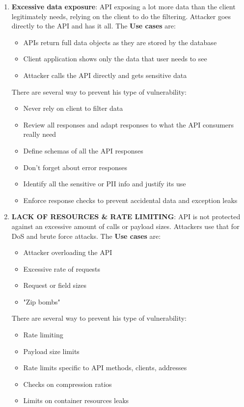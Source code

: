 \documentclass[10pt,a4paper]{report}
\begin{document}
\begin{enumerate}
	\item \textbf{Excessive data exposure}: API exposing a lot more data than the client legitimately needs, relying on the client to do the filtering. Attacker goes directly to the API and has it all. The \textbf{Use cases} are:
	\begin{itemize}
		\item APIs return full data objects as they are stored by the database
		\item Client application shows only the data that user needs to see
		\item Attacker calls the API directly and gets sensitive data
	\end{itemize}
	There are several way to prevent his type of vulnerability:
	\begin{itemize}
		\item Never rely on client to filter data
		\item Review all responses and adapt responses to what the API
		consumers really need
		\item Define schemas of all the API responses
		\item Don’t forget about error responses
		\item Identify all the sensitive or PII info and justify its use
		\item Enforce response checks to prevent accidental data and exception
		leaks
	\end{itemize}


		\item \textbf{LACK OF RESOURCES \& RATE LIMITING}: API is not protected against an excessive amount of calls or payload sizes. Attackers use that for DoS and brute force attacks. The \textbf{Use cases} are:
	\begin{itemize}
		\item Attacker overloading the API
		\item Excessive rate of requests
		\item Request or field sizes
		\item  "Zip bombs"
	\end{itemize}
	There are several way to prevent his type of vulnerability:
	\begin{itemize}
		\item  Rate limiting
		\item  Payload size limits
		\item  Rate limits specific to API methods, clients, addresses
		\item  Checks on compression ratios
		\item  Limits on container resources leaks
	\end{itemize}


\end{enumerate}
\end{document}
